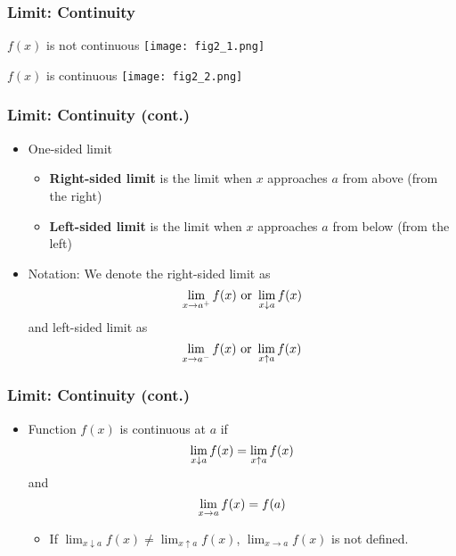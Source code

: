 \documentclass[pdflatex, 12pt]{beamer}
\begin{document}
\begin{frame}
\frametitle{Limit: Continuity}
\begin{minipage}{0.49\textwidth}
$f(x)$ is not continuous
\centering
\texttt{[image: fig2\_1.png]}
\end{minipage}
\begin{minipage}{0.49\textwidth}
$f(x)$ is continuous
\centering
\texttt{[image: fig2\_2.png]}
\end{minipage}
\end{frame}

\begin{frame}
\frametitle{Limit: Continuity (cont.)}
\begin{itemize}
\item One-sided limit
 \begin{itemize}
 \item \textbf{Right-sided limit} is the limit when $x$ approaches $a$ from above (from the right)
 \item \textbf{Left-sided limit} is the limit when $x$ approaches $a$ from below (from the left)
 \end{itemize}
\vspace{0.4cm}
\item Notation: We denote the right-sided limit as
 \begin{equation}
 \lim_{x \to a^{+}} f(x) \ \mathrm{or} \ \lim_{x \downarrow a} f(x) \notag
 \end{equation}
and left-sided limit as
 \begin{equation}
 \lim_{x \to a^{-}} f(x) \ \mathrm{or} \ \lim_{x \uparrow a} f(x) \notag
 \end{equation}
\end{itemize}
\end{frame}

\begin{frame}
\frametitle{Limit: Continuity (cont.)}
\begin{itemize}
\item Function $f(x)$ is continuous at $a$ if 
 \begin{equation}
 \lim_{x \downarrow a} f(x) = \lim_{x \uparrow a} f(x) \notag
 \end{equation}
 and
 \begin{equation}
 \lim_{x \to a} f(x) = f(a) \notag
 \end{equation}
 \begin{itemize}
 \item If $\lim_{x \downarrow a} f(x) \neq \lim_{x \uparrow a} f(x)$, $\lim_{x \to a} f(x)$ is not defined.
 \end{itemize}
\end{itemize}
\end{frame}
\end{document}

